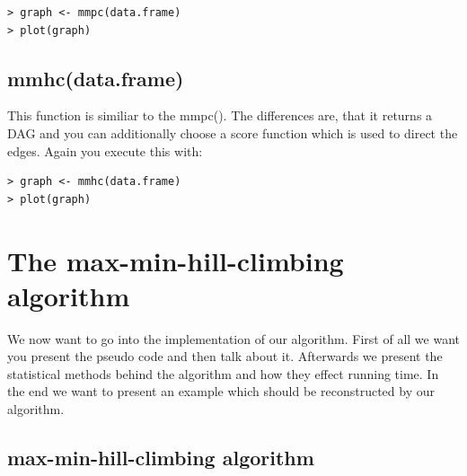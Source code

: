 		\begin{verbatim}
> graph <- mmpc(data.frame)
> plot(graph)
		\end{verbatim}

	\section{mmhc(data.frame)}

		This function is similiar to the mmpc(). The differences are, that it returns a DAG and you can additionally choose a score function which is used to direct the edges. Again you execute this with:

		\begin{verbatim}
> graph <- mmhc(data.frame)
> plot(graph)
		\end{verbatim}

\chapter{The max-min-hill-climbing algorithm}

	We now want to go into the implementation of our algorithm. First of all we want you present the pseudo code and then talk about it. Afterwards we present the statistical methods behind the algorithm and how they effect running time. In the end we want to present an example which should be reconstructed by our algorithm.

	\section{max-min-hill-climbing algorithm}

		 \label{img.mmhc}


